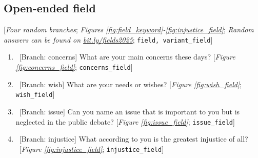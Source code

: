 \begin{enumerate}[resume]


\end{enumerate} 

 \subsection*{Open-ended field} 
 [\textit{Four random branches}; \textit{Figures \ref{fig:field_keyword}-\ref{fig:injustice_field}}; \textit{Random answers can be found on \href{http://preferences-pol.fr/fields2025.html}{bit.ly/fields2025}}; 
 \verb|field, variant_field|] 
 \begin{enumerate}[resume] 
\item  \label{q:concerns_field} ~[Branch: concerns] What are your main concerns these days? [\textit{Figure \ref{fig:concerns_field}}; 
\verb|concerns_field|]


\item  \label{q:wish_field} ~[Branch: wish] What are your needs or wishes? [\textit{Figure \ref{fig:wish_field}}; 
\verb|wish_field|]


\item  \label{q:issue_field} ~[Branch: issue] Can you name an issue that is important to you but is neglected in the public debate? [\textit{Figure \ref{fig:issue_field}}; 
\verb|issue_field|]


\item  \label{q:injustice_field} ~[Branch: injustice] What according to you is the greatest injustice of all?\\ 
~[\textit{Figure \ref{fig:injustice_field}}; 
\verb|injustice_field|]


\end{enumerate} 

